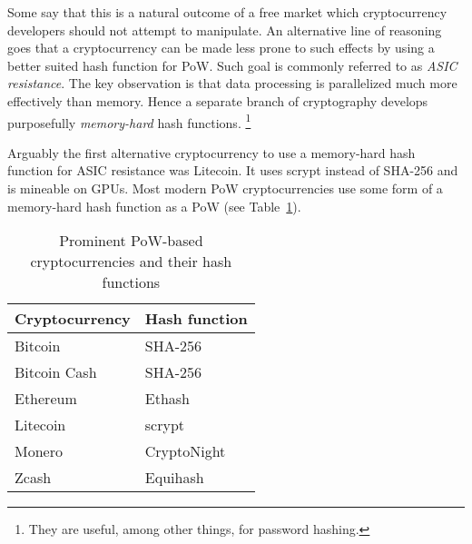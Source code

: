 Some say that this is a natural outcome of a free market which cryptocurrency developers should not attempt to manipulate.
An alternative line of reasoning goes that a cryptocurrency can be made less prone to such effects by using a better suited hash function for PoW.
Such goal is commonly referred to as \textit{ASIC resistance}.
The key observation is that data processing is parallelized much more effectively than memory.
Hence a separate branch of cryptography develops purposefully \textit{memory-hard} hash functions.
\footnote{They are useful, among other things, for password hashing.}

Arguably the first alternative cryptocurrency to use a memory-hard hash function for ASIC resistance was Litecoin.
It uses scrypt instead of SHA-256 and is mineable on GPUs.
Most modern PoW cryptocurrencies use some form of a memory-hard hash function as a PoW (see Table~\ref{tab:pow-coins-hash-functions}).

\begin{table}[]
	\begin{tabular}{|l|l|}
		\hline
		\textbf{Cryptocurrency} & \textbf{Hash function} \\ \hline
		Bitcoin & SHA-256 \\ \hline
		Bitcoin Cash & SHA-256 \\ \hline
		Ethereum & Ethash \\ \hline
		Litecoin & scrypt \\ \hline
		Monero & CryptoNight \\ \hline
		Zcash & Equihash \\ \hline
	\end{tabular}
	\caption{Prominent PoW-based cryptocurrencies and their hash functions}
	\label{tab:pow-coins-hash-functions}
\end{table}

